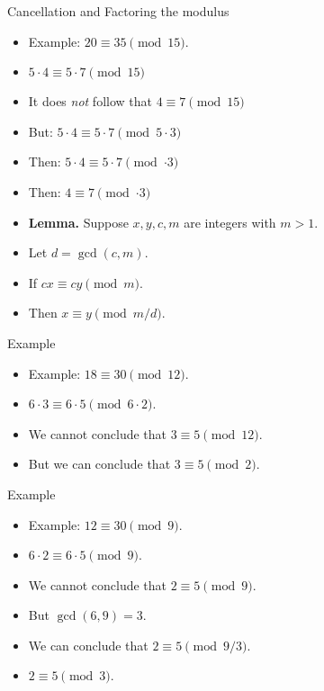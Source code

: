 \documentclass{beamer}
\begin{document}
\begin{frame}{Cancellation and Factoring the modulus}
\begin{itemize}
  \item Example: $20 \equiv 35 \pmod {15}$.
  \item $5\cdot 4 \equiv 5 \cdot 7 \pmod {15}$
  \item It does \emph{not} follow that $4 \equiv 7 \pmod {15}$
  \item But:  $5\cdot 4 \equiv 5 \cdot 7 \pmod {5\cdot3}$
  \item Then:  $5\cdot 4 \equiv 5 \cdot 7 \pmod {\cdot3}$
  \item Then:  $4 \equiv  7 \pmod {\cdot3}$
  \item \textbf{Lemma.} Suppose $x,y,c,m$ are integers with $m>1$.
  \item Let $d=\gcd(c,m)$.
  \item If $cx\equiv cy \pmod m$.
  \item Then $x\equiv y \pmod {m/d}$.
\end{itemize}
\end{frame}

\begin{frame}{Example}
\begin{itemize}
  \item Example: $18 \equiv 30 \pmod {12}$.
  \item $6 \cdot 3 \equiv 6 \cdot 5 \pmod {6\cdot 2}$.
  \item We cannot conclude that $3\equiv 5 \pmod {12}$.
  \item But we can conclude that $3\equiv 5 \pmod 2$.
\end{itemize}
\end{frame}

\begin{frame}{Example}
\begin{itemize}
  \item Example: $12 \equiv 30 \pmod {9}$.
  \item $6 \cdot 2 \equiv 6 \cdot 5 \pmod {9}$.
  \item We cannot conclude that $2\equiv 5 \pmod {9}$.
  \item But $\gcd(6,9) = 3$.
  \item We can conclude that $2\equiv 5 \pmod {9/3}$.
  \item $2\equiv 5 \pmod 3$.
\end{itemize}
\end{frame}
\end{document}
